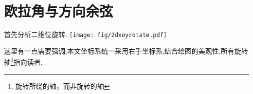 \section{欧拉角与方向余弦}
首先分析二维位旋转.
\texttt{[image: fig/2dxoyrotate.pdf]}


这里有一点需要强调,本文坐标系统一采用右手坐标系,结合绘图的美观性,所有旋转轴\footnote{旋转所绕的轴，而非旋转的轴}指向读者.

